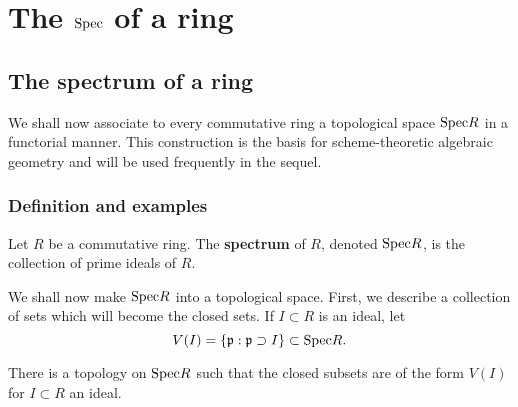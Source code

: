 \chapter{The $\mathrm{Spec}$ of a ring}


\section{The spectrum of a ring}

We shall now associate to every commutative ring a topological space $\mathrm{Spec} R$
in a functorial manner. This construction is the basis for scheme-theoretic
algebraic geometry and will be used frequently in the sequel. 

\subsection{Definition and examples}

\begin{definition} 
Let $R$ be a commutative ring.  The \textbf{spectrum} of $R$, denoted $\mathrm{Spec} R$, is
the collection of prime ideals of $R$.
\end{definition} 

We shall now make $\mathrm{Spec} R$ into a topological space. First, we describe a
collection of sets which will become the closed sets. 
If $I \subset R$ is an ideal, let
\[ V(I) = \left\{\mathfrak{p}: \mathfrak{p} \supset I\right\} \subset \mathrm{Spec} R.
\]

\begin{proposition} 
There is a topology on $\mathrm{Spec} R$ such that the closed subsets are of the form
$V(I)$ for $I \subset R$ an ideal.
\end{proposition} 

